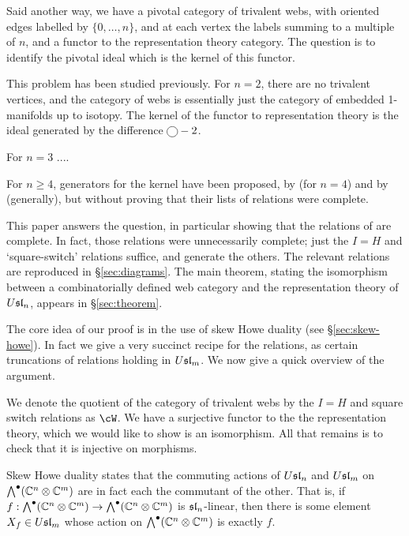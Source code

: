 \documentclass[11pt,leqno]{article}
\begin{document}
Said another way, we have a pivotal category of trivalent webs, with oriented edges labelled by $\{0, \ldots, n\}$, and at each vertex the labels summing to a multiple of $n$, and a functor to the representation theory category. The question is to identify the pivotal ideal which is the kernel of this functor.

This problem has been studied previously. For $n=2$, there are no trivalent vertices, and the category of webs is essentially just the category of embedded 1-manifolds up to isotopy. The kernel of the functor to representation theory is the ideal generated by the difference $\tikz[baseline=-2pt]{\node[draw,circle] {};} - 2$. 

For $n=3$ .... 

For $n \geq 4$, generators for the kernel have been proposed, by \cite{math.QA/0310143} (for $n=4$) and by \cite{0704.1503} (generally), but without proving that their lists of relations were complete.

This paper answers the question, in particular showing that the relations of \cite{0704.1503} are complete. In fact, those relations were unnecessarily complete; just the $I=H$ and `square-switch' relations suffice, and generate the others. The relevant relations are reproduced in \S\ref{sec:diagrams}.
The main theorem, stating the isomorphism between a combinatorially defined web category and the representation theory of $\Usl{n}$, appears in \S \ref{sec:theorem}.

The core idea of our proof is in the use of skew Howe duality (see \S \ref{sec:skew-howe}). In fact we give a very succinct recipe for the relations, as certain truncations of relations holding in $\Usl{m}$. We now give a quick overview of the argument.

We denote the quotient of the category of trivalent webs by the $I=H$ and square switch relations as $\cW$. We have a surjective functor to the the representation theory, which we would like to show is an isomorphism. All that remains is to check that it is injective on morphisms.

Skew Howe duality states that the commuting actions of $\Usl{n}$ and $\Usl{m}$ on $\Alt^\bullet(\mathbb{C}^n \tensor \mathbb{C}^m)$ are in fact each the commutant of the other. That is, if  $f: \Alt^\bullet(\mathbb{C}^n \tensor \mathbb{C}^m) \to \Alt^\bullet(\mathbb{C}^n \tensor \mathbb{C}^m)$ is $\sl{n}$-linear, then there is some element $X_f \in \Usl{m}$ whose action on  $\Alt^\bullet(\mathbb{C}^n \tensor \mathbb{C}^m)$ is exactly $f$.
\end{document}
